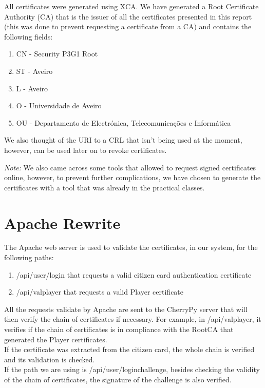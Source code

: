 \documentclass[11pt,a4paper]{report}
\begin{document}
All certificates were generated using XCA.
We have generated a Root Certificate Authority (CA) that is the issuer of all the certificates presented in this report (this was done to prevent requesting a certificate from a CA) and contains the following fields:
\begin{enumerate}
\item CN - Security P3G1 Root
\item ST - Aveiro
\item L - Aveiro
\item O - Universidade de Aveiro
\item OU - Departamento de Electrónica, Telecomunicações e Informática
\end{enumerate}
We also thought of the URI to a CRL that isn't being used at the moment, however, can be used later on to revoke certificates.

\emph{Note:} We also came across some tools that allowed to request signed certificates online, however, to prevent further complications, we have chosen to generate the certificates with a tool that was already in the practical classes.

\section{Apache Rewrite}

The Apache web server is used to validate the certificates, in our system, for the following paths:
\begin{enumerate}
\item /api/user/login that requests a valid citizen card authentication certificate
\item /api/valplayer that requests a valid Player certificate
\end{enumerate}

All the requests validate by Apache are sent to the CherryPy server that will then verify the chain of certificates if necessary. For example, in /api/valplayer, it verifies if the chain of certificates is in compliance with the RootCA that generated the Player certificates.\\
If the certificate was extracted from the citizen card, the whole chain is verified and its validation is checked.\\
If the path we are using is /api/user/loginchallenge, besides checking the validity of the chain of certificates, the signature of the challenge is also verified.\\
\end{document}
